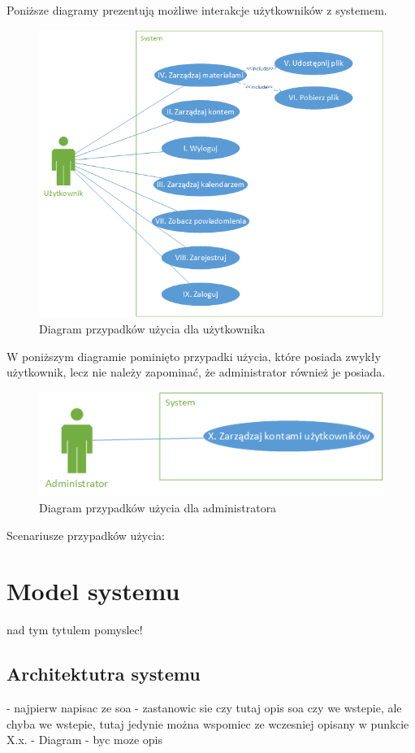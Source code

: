Poniższe diagramy prezentują możliwe interakcje użytkowników z systemem.
\begin{figure}[h]
	\centering
	\includegraphics[scale=0.7]{UseCaseUser}
	\caption{\label{fig:caption_01}Diagram przypadków użycia dla użytkownika}
\end{figure}
W poniższym diagramie pominięto przypadki użycia, które posiada zwykły użytkownik, lecz nie należy zapominać, że administrator również je posiada.
\begin{figure}[ht]
	\centering
	\includegraphics[scale=0.7]{UseCaseAdmin.png}
	\caption{\label{fig:caption_02}Diagram przypadków użycia dla administratora}
\end{figure}

Scenariusze przypadków użycia:


\section{Model systemu}
nad tym tytulem pomyslec!\newline
\subsection{Architektutra systemu}
- najpierw napisac ze soa\newline
- zastanowic sie czy tutaj opis soa czy we wstepie, ale chyba we wstepie, tutaj jedynie można wspomiec ze wczesniej opisany w punkcie X.x.\newline
- Diagram \newline
- byc moze opis

